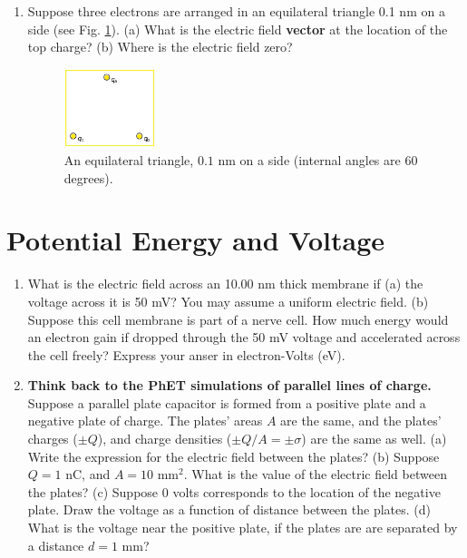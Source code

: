 \documentclass[10pt]{article}
\begin{document}
\begin{enumerate}
\item Suppose three electrons are arranged in an equilateral triangle 0.1 nm on a side (see Fig. \ref{fig:tri}).  (a) What is the electric field \textbf{vector} at the location of the top charge? (b) Where is the electric field zero?
\begin{figure}[ht]
\centering
\includegraphics[width=0.25\textwidth]{tri.jpeg}
\caption{\label{fig:tri} An equilateral triangle, $0.1$ nm on a side (internal angles are 60 degrees).}
\end{figure}
\end{enumerate}

\section{Potential Energy and Voltage}

\begin{enumerate}
\item What is the electric field across an 10.00 nm thick membrane if (a) the voltage across it is 50 mV? You may assume a uniform electric field. (b) Suppose this cell membrane is part of a nerve cell.  How much energy would an electron gain if dropped through the 50 mV voltage and accelerated across the cell freely?  Express your anser in electron-Volts (eV). \\ \vspace{2cm}
\item \textbf{Think back to the PhET simulations of parallel lines of charge.}  Suppose a parallel plate capacitor is formed from a positive plate and a negative plate of charge.  The plates' areas $A$ are the same, and the plates' charges ($\pm Q$), and charge densities ($\pm Q/A = \pm \sigma$) are the same as well. (a) Write the expression for the electric field between the plates? (b) Suppose $Q = 1$ nC, and $A = 10$ mm$^2$.  What is the value of the electric field between the plates?  (c) Suppose 0 volts corresponds to the location of the negative plate.  Draw the voltage as a function of distance between the plates.  (d) What is the voltage near the positive plate, if the plates are are separated by a distance $d = 1$ mm? \\ \vspace{2cm}
\end{enumerate}
\end{document}
